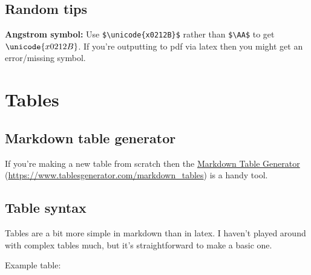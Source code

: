 \documentclass[
]{book}
\begin{document}
\section{Random tips}\label{sec:random-tips}

\textbf{Angstrom symbol:} Use \texttt{\$\textbackslash{}unicode\{x0212B\}\$} rather than \texttt{\$\textbackslash{}AA\$} to get \(\unicode{x0212B}\). If you're outputting to pdf via latex then you might get an error/missing symbol.

\chapter{Tables}\label{sec:tables}

\section{Markdown table generator}\label{sec:md-tab-gen}

If you're making a new table from scratch then the \hyperref[sec:md-tab-gen]{Markdown Table Generator} (\url{https://www.tablesgenerator.com/markdown_tables}) is a handy tool.

\section{Table syntax}\label{sec:tab-syntax}

Tables are a bit more simple in markdown than in latex. I haven't played around with complex tables much, but it's straightforward to make a basic one.

Example table:
\end{document}
